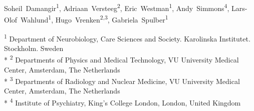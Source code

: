 Soheil~Damangir\textsuperscript{1}, 
Adriaan~Versteeg\textsuperscript{2}, 
Eric~Westman\textsuperscript{1}, 
Andy~Simmons\textsuperscript{4}, 
Lars-Olof~Wahlund\textsuperscript{1}, 
Hugo~Vrenken\textsuperscript{2,3}, 
Gabriela~Spulber\textsuperscript{1}

\textsuperscript{1} Department of Neurobiology, Care Sciences and Society. Karolinska Institutet. Stockholm. Sweden
\\*
\textsuperscript{2} Departments of Physics and Medical Technology, VU University Medical Center, Amsterdam, The Netherlands
\\*
\textsuperscript{3} Departments of Radiology and Nuclear Medicine, VU University Medical Center, Amsterdam, The Netherlands
\\*
\textsuperscript{4} Institute of Psychiatry, King's College London, London, United Kingdom
  
  
  
  
  
  
  
  
  
  